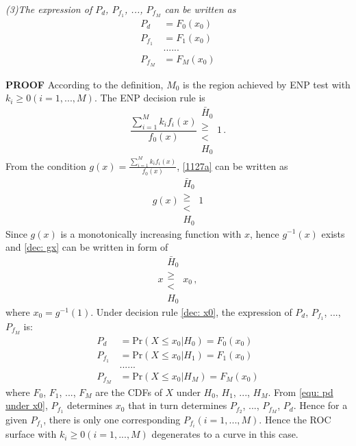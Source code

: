   \textit{(3)The expression of $P_d$, $P_{f_1}$, ..., $P_{f_M}$ can be written as}
  \begin{equation}
	\label{equ: chi pd}
	\begin{split}
	  P_d & = F_0(x_0)\\
	  P_{f_1} & = F_1(x_0)\\
	  &......\\
	  P_{f_M} & = F_M(x_0)
	\end{split}
  \end{equation}

  \noindent \textbf{PROOF}
  According to the definition, $M_0$ is the region achieved by ENP test with $k_i \geq 0 (i=1, ..., M)$. The ENP decision rule is
  \begin{equation}
	\label{1127a}
	\frac{\sum_{i=1}^{M}k_if_i(x)}{f_0(x)} \substack{\bar{H}_0 \\\geq\\< \\H_0}1\,.
  \end{equation}
  From the condition $g(x) = \frac{\sum_{i=1}^{M}k_if_i(x)}{f_0(x)} $, \eqref{1127a} can be written as 
  \begin{equation}
	\label{dec: gx}
	g(x)\substack{\bar{H}_0 \\\geq\\< \\H_0}1
  \end{equation}
  Since $g(x)$ is a monotonically increasing function with $x$, hence $g^{-1}(x)$ exists and \eqref{dec: gx} can be written in form of 
  \begin{equation}
	\label{dec: x0}
	x\substack{\bar{H}_0 \\\geq\\< \\H_0}x_0\,,
  \end{equation}
  where $x_0 = g^{-1}(1)$.
  Under decision rule \eqref{dec: x0}, the expression of $P_d$, $P_{f_1}$, ..., $P_{f_M}$ is: 
  \begin{equation}
	\begin{split}
	  \label{equ: pd under x0}
	  P_d &= \text{Pr}(X \leq x_0 | H_0) = F_0(x_0)\\
	  P_{f_1} &= \text{Pr}(X \leq x_0 | H_1) = F_1(x_0)\\
	  &......\\
	  P_{f_M} &= \text{Pr}(X \leq x_0 | H_M) = F_M(x_0)
	\end{split}
  \end{equation}
  where $F_0$, $F_1$, ..., $F_M$ are the CDFs of $X$ under $H_0$, $H_1$, ..., $H_M$. From \eqref{equ: pd under x0}, $P_{f_1}$ determines $x_0$ that in turn determines $P_{f_2}$, ..., $P_{f_M}$, $P_d$. Hence for a given $P_{f_1}$, there is only one corresponding $P_{f_i} (i= 1, ..., M)$. Hence the ROC surface with $k_i \geq 0 (i = 1, ..., M)$ degenerates to a curve in this case.

